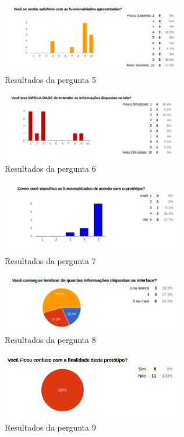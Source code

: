 \begin{itemize}
\begin{figure}[h]
  \centering
  \includegraphics[width=300px, scale=1]{figuras/result5}
  \caption{Resultados da pergunta 5}
\label{fig:result5}
\end{figure}


\begin{figure}[h]
  \centering
  \includegraphics[width=300px, scale=1]{figuras/result6}
  \caption{Resultados da pergunta 6}
\label{fig:result6}
\end{figure}


\begin{figure}[h]
  \centering
  \includegraphics[width=300px, scale=1]{figuras/result7}
  \caption{Resultados da pergunta 7}
\label{fig:result7}
\end{figure}


\begin{figure}[h]
  \centering
  \includegraphics[width=300px, scale=1]{figuras/result8}
  \caption{Resultados da pergunta 8}
\label{fig:result8}
\end{figure}


\begin{figure}[h]
  \centering
  \includegraphics[width=300px, scale=1]{figuras/result9}
  \caption{Resultados da pergunta 9}
\label{fig:result9}
\end{figure}



\end{itemize}
